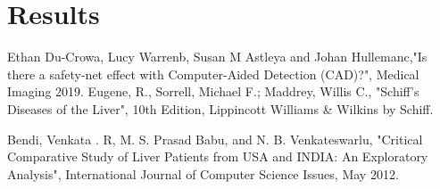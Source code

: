 \documentclass[]{article}
\begin{document}
\section{Results}
\label{sec:results}

\begin{thebibliography}{9}
Ethan Du-Crowa, Lucy Warrenb, Susan M Astleya and Johan Hullemanc,"Is there a safety-net effect with Computer-Aided Detection (CAD)?", Medical Imaging 2019.
Eugene, R., Sorrell, Michael F.; Maddrey, Willis C., "Schiff's Diseases of the Liver", 10th Edition, Lippincott Williams \& Wilkins by Schiff.

Bendi,  Venkata . R, M. S. Prasad Babu, and N. B. Venkateswarlu, "Critical Comparative Study of Liver Patients from USA and INDIA: An Exploratory Analysis", International Journal of Computer Science Issues, May 2012.


\end{thebibliography}
\end{document}
